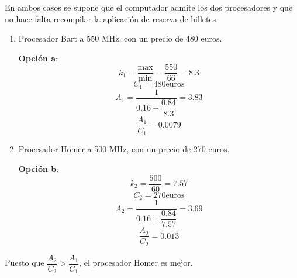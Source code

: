 En ambos casos se supone que el computador admite los dos procesadores y que no hace falta recompilar la aplicación de reserva de billetes.
\begin{enumerate}
    \item Procesador Bart a 550 MHz, con un precio de 480 euros.
\begin{tcolorbox}[colback=white,colframe=cyan!50!black,fonttitle=\bfseries]
\textbf{Opción a}:
\[
k_1=\dfrac{\text{max}}{\text{min}}=\dfrac{550}{66}=8.3
\]
\[
C_1=480\text{euros}
\]
\[
A_1=\dfrac{1}{0.16+\dfrac{0.84}{8.3}}=3.83
\]
\[
\dfrac{A_1}{C_1}=0.0079
\]
\end{tcolorbox}    
    \item Procesador Homer a 500 MHz, con un precio de 270 euros.
\begin{tcolorbox}[colback=white,colframe=cyan!50!black,fonttitle=\bfseries]
\textbf{Opción b}:
\[
k_2=\dfrac{500}{60}=7.57
\]
\[
C_2=270\text{euros}
\]
\[
A_2=\dfrac{1}{0.16+\dfrac{0.84}{7.57}}=3.69
\]
\[
\dfrac{A_2}{C_2}=0.013
\]
\end{tcolorbox}    
\end{enumerate}
\begin{tcolorbox}[colback=white,colframe=cyan!50!black,fonttitle=\bfseries]
Puesto que $\dfrac{A_2}{C_2}>\dfrac{A_1}{C_1}$, el procesador Homer es mejor.

\end{tcolorbox}
